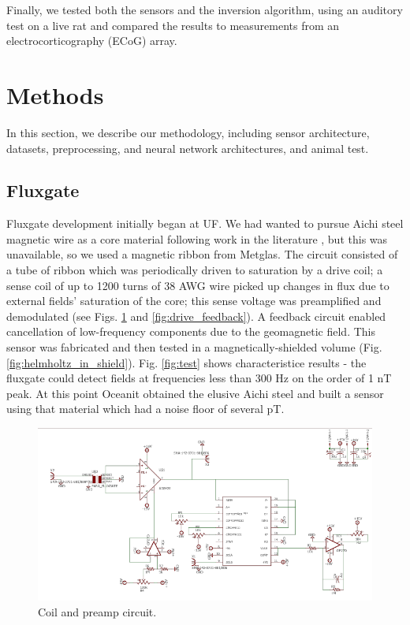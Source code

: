 \documentclass[journal,12pt,onecolumn,draftclsnofoot]{IEEEtran}
\begin{document}
Finally, we tested both the sensors and the inversion algorithm, using an auditory test on a live rat and compared the results to measurements from an electrocorticography (ECoG) array.

\section{Methods}

In this section, we describe our methodology, including sensor architecture, datasets, preprocessing, and neural network architectures, and animal test.

\subsection{Fluxgate}

Fluxgate development initially began at UF. We had wanted to pursue Aichi steel magnetic wire as a core material following work in the literature
\cite{sasada2014fundamental}, but this was unavailable, so we used a magnetic ribbon from Metglas. The circuit consisted of a tube of ribbon which was periodically driven to saturation by a drive coil; a sense coil of up to 1200 turns of 38 AWG wire picked up changes in flux due to external fields' saturation of the core; this sense voltage was preamplified and demodulated (see Figs. \ref{fig:coil_preamp} and \ref{fig:drive_feedback}). A feedback circuit enabled cancellation of low-frequency components due to the geomagnetic field. This sensor was fabricated and then tested in a magnetically-shielded volume (Fig. \ref{fig:helmholtz_in_shield}). Fig. \ref{fig:test} shows characteristice results - the fluxgate could detect fields at frequencies less than 300 Hz on the order of 1 nT peak. At this point Oceanit obtained the elusive Aichi steel and built a sensor using that material which had a noise floor of several pT.

\begin{figure}[h!]
\centering
\includegraphics[width=5in]{finalplots/coil_preamp}
\caption{Coil and preamp circuit.}
\label{fig:coil_preamp}
\end{figure}
\end{document}
